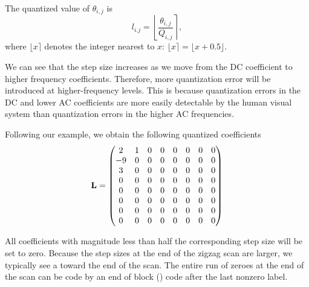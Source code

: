 \documentclass[a4paper, 11pt, openany]{book}
\begin{document}
The quantized value of $\theta_{i,j}$ is
\[
    l_{i.j} = \left\lfloor \frac{ \theta_{i,j} }{ Q_{i,j} } \right\rceil,
\]
where $\lfloor x \rceil$ denotes the integer nearest to $x$: $\lfloor x \rceil = \lfloor x + 0.5 \rfloor$.


We can see that the step size increases as we move from the DC coefficient to higher frequency coefficients. Therefore, more quantization error will be introduced at higher-frequency levels. This is because quantization errors in the DC and lower AC coefficients are more easily detectable by the human visual system than quantization errors in the higher AC frequencies.

Following our example, we obtain the following quantized coefficients
\[
    {\bf L} = \begin{pmatrix}
    2 & 1 & 0 & 0 & 0 & 0 & 0 & 0\\
    -9 & 0 & 0 & 0 & 0 & 0 & 0 & 0\\
    3 & 0 & 0 & 0 & 0 & 0 & 0 & 0\\
    0 & 0 & 0 & 0 & 0 & 0 & 0 & 0\\
    0 & 0 & 0 & 0 & 0 & 0 & 0 & 0\\
    0 & 0 & 0 & 0 & 0 & 0 & 0 & 0\\
    0 & 0 & 0 & 0 & 0 & 0 & 0 & 0\\
    0 & 0 & 0 & 0 & 0 & 0 & 0 & 0
    \end{pmatrix}
\]

All coefficients with magnitude less than half the corresponding step size will be set to zero. Because the step sizes at the end of the zigzag scan are larger, we typically see a  toward the end of the scan. The entire run of zeroes at the end of the scan can be code by an end of block () code after the last nonzero label.
\end{document}
